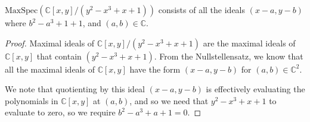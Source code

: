 \begin{example}
    $\mathrm{MaxSpec}(\mathbb{C}[x,y]/(y^2 - x^3 + x + 1))$ consists of all the ideals $(x-a, y-b)$ where $b^2 - a^3 + 1 + 1$, and $(a,b) \in \mathbb{C}$.
\end{example}
\begin{proof}
    Maximal ideals of $\mathbb{C}[x,y]/(y^2 - x^3 + x + 1)$ are the maximal ideals of $\mathbb{C}[x,y]$ that contain $(y^2 - x^3 + x + 1)$. From the Nullstellensatz, we know that all the maximal ideals of $\mathbb{C}[x,y]$ have the form $(x-a,y-b)$ for $(a,b) \in \mathbb{C}^2$.

    We note that quotienting by this ideal $(x-a, y-b)$ is effectively evaluating the polynomials in $\mathbb{C}[x,y]$ at $(a,b)$, and so we need that $y^2-x^3+x+1$ to evaluate to zero, so we require $b^2-a^3+a+1 = 0$.
\end{proof}

\renewcommand\qedsymbol{$\square$}

